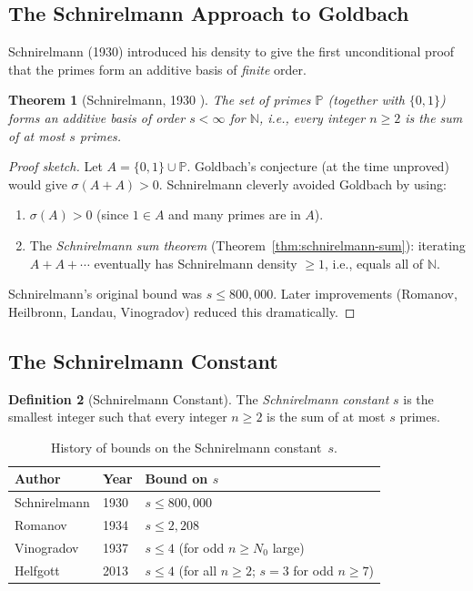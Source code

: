 \documentclass[12pt,a4paper]{amsart}
\newtheorem{theorem}{Theorem}[section]
\theoremstyle{definition}
\newtheorem{definition}[theorem]{Definition}
\newcommand{\N}{\mathbb{N}}
\begin{document}
\subsection{The Schnirelmann Approach to Goldbach}

Schnirelmann (1930) introduced his density to give the first unconditional
proof that the primes form an additive basis of \emph{finite} order.

\begin{theorem}[Schnirelmann, 1930 \cite{Schnirelmann1930}]
\label{thm:schnirelmann}
The set of primes $\mathbb{P}$ (together with $\{0, 1\}$) forms an
additive basis of order $s < \infty$ for $\N$, i.e., every integer
$n \geq 2$ is the sum of at most $s$ primes.
\end{theorem}

\begin{proof}[Proof sketch]
Let $A = \{0, 1\} \cup \mathbb{P}$.  Goldbach's conjecture (at the time
unproved) would give $\sigma(A + A) > 0$.  Schnirelmann cleverly avoided
Goldbach by using:
\begin{enumerate}[label=(\arabic*)]
\item $\sigma(A) > 0$ (since $1 \in A$ and many primes are in $A$).
\item The \emph{Schnirelmann sum theorem}
      (Theorem~\ref{thm:schnirelmann-sum}): iterating $A + A + \cdots$
      eventually has Schnirelmann density $\geq 1$, i.e., equals all of $\N$.
\end{enumerate}
Schnirelmann's original bound was $s \leq 800{,}000$.  Later improvements
(Romanov, Heilbronn, Landau, Vinogradov) reduced this dramatically.
\end{proof}

\subsection{The Schnirelmann Constant}

\begin{definition}[Schnirelmann Constant]
The \emph{Schnirelmann constant} $s$ is the smallest integer such that
every integer $n \geq 2$ is the sum of at most $s$ primes.
\end{definition}

\begin{table}[h]
\centering
\begin{tabular}{@{}lll@{}}
\toprule
Author & Year & Bound on $s$ \\
\midrule
Schnirelmann & 1930 & $s \leq 800{,}000$ \\
Romanov      & 1934 & $s \leq 2{,}208$ \\
Vinogradov   & 1937 & $s \leq 4$ (for odd $n \geq N_0$ large) \\
Helfgott     & 2013 & $s \leq 4$ (for all $n \geq 2$; $s = 3$ for odd $n \geq 7$) \\
\bottomrule
\end{tabular}
\caption{History of bounds on the Schnirelmann constant~$s$.}
\label{tab:schnirelmann}
\end{table}
\end{document}

